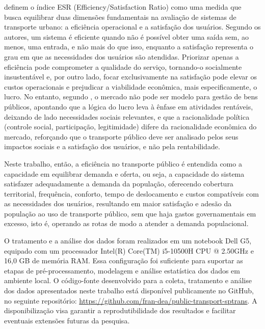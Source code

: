 \citet{SUGUIY2020938} definem o índice ESR (Efficiency/Satisfaction Ratio) como uma medida que busca equilibrar duas dimensões fundamentais na avaliação de sistemas de transporte urbano: a eficiência operacional e a satisfação dos usuários. Segundo os autores, um sistema é eficiente quando não é possível obter uma saída sem, ao menos, uma entrada, e não mais do que isso, enquanto a satisfação representa o grau em que as necessidades dos usuários são atendidas. Priorizar apenas a eficiência pode comprometer a qualidade do serviço, tornando-o socialmente insustentável e, por outro lado, focar exclusivamente na satisfação pode elevar os custos operacionais e prejudicar a viabilidade econômica, mais especificamente, o lucro. No entanto, segundo \citet{schwartzman1975}, o mercado não pode ser modelo para gestão de bens públicos, apontando que a lógica do lucro leva à ênfase em atividades rentáveis, deixando de lado necessidades sociais relevantes, e que a racionalidade política (controle social, participação, legitimidade) difere da racionalidade econômica do mercado, reforçando que o transporte público deve ser analisado pelos seus impactos sociais e a satisfação dos usuários, e não pela rentabilidade.

Neste trabalho, então, a eficiência no transporte público é entendida como a capacidade em equilibrar demanda e oferta, ou seja, a capacidade do sistema satisfazer adequadamente a demanda da população, oferecendo cobertura territorial, frequência, conforto, tempo de deslocamento e custos compatíveis com as necessidades dos usuários, resultando em maior satisfação e adesão da população ao uso de transporte público, sem que haja gastos governamentais em excesso, isto é, operando as rotas de modo a atender a demanda populacional. 

O tratamento e a análise dos dados foram realizados em um notebook Dell G5, equipado com um processador Intel(R) Core(TM) i5-10500H CPU @ 2.50GHz e 16,0 GB de memória RAM. Essa configuração foi suficiente para suportar as etapas de pré-processamento, modelagem e análise estatística dos dados em ambiente local. O código-fonte desenvolvido para a coleta, tratamento e análise dos dados apresentados neste trabalho está disponível publicamente no GitHub, no seguinte repositório: \url{https://github.com/fran-dea/public-transport-sptrans}. A disponibilização visa garantir a reprodutibilidade dos resultados e facilitar eventuais extensões futuras da pesquisa.